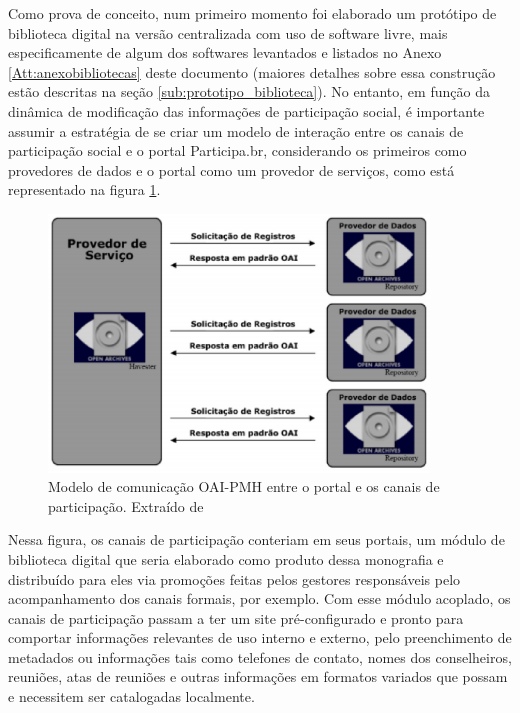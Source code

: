 Como prova de conceito, num primeiro momento foi elaborado um protótipo de biblioteca digital na versão centralizada com uso de software livre, mais especificamente de algum dos softwares levantados e listados no Anexo \ref{Att:anexobibliotecas} deste documento (maiores detalhes sobre essa construção estão descritas na seção \ref{sub:prototipo_biblioteca}). No entanto, em função da dinâmica de modificação das informações de participação social, é importante assumir a estratégia de se criar um modelo de interação entre os canais de participação social e o portal Participa.br, considerando os primeiros como provedores de dados e o portal como um provedor de serviços, como está representado na figura \ref{fig:modeloaipmh}.

\graphicspath{{figuras/}}
\begin{figure}[H]
\centering
\includegraphics[width=0.9\textwidth]{modelo-oaipmh}
\caption[Modelo de comunicação OAI-PMH entre o portal e os mecanismos]{Modelo de comunicação OAI-PMH entre o portal e os canais de participação. Extraído de \cite{renan2009interoperabilidade}}
\label{fig:modeloaipmh}
\end{figure}

Nessa figura, os canais de participação conteriam em seus portais, um módulo de biblioteca digital que seria elaborado como produto dessa monografia e distribuído para eles via promoções feitas pelos gestores responsáveis pelo acompanhamento dos canais formais, por exemplo. Com esse módulo acoplado, os canais de participação passam a ter um site pré-configurado e pronto para comportar informações relevantes de uso interno e externo, pelo preenchimento de metadados ou informações tais como telefones de contato, nomes dos conselheiros, reuniões, atas de reuniões e outras informações em formatos variados que possam e necessitem ser catalogadas localmente.


